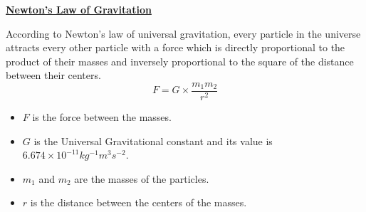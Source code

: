 \begin{center}
\Large{\textbf{\underline{Newton's Law of Gravitation}}}
\end{center}
According to Newton's law of universal gravitation, every particle in the universe attracts every other particle with a force which is directly proportional to the product of their masses and inversely proportional to the square of the distance between their centers.
\begin{equation}
F = G \times \frac{m_1 m_2}{r^2}  
\end{equation}
\begin{itemize}
  \item $F$ is the force between the masses.
  \item $G$ is the Universal Gravitational constant and its value is $6.674 \times 10 ^{-11}  kg^{-1}m^{3}s^{-2}$.
  \item $m_1$ and $m_2$ are the masses of the particles.
  \item $r$ is the distance between the centers of the masses.
\end{itemize}


